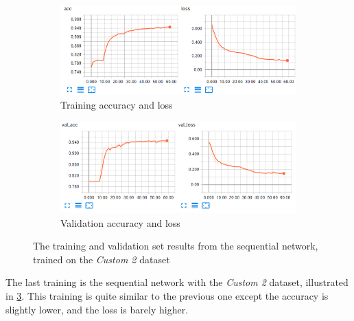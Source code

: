\documentclass[USenglish]{ifimaster}  %
\begin{document}
\begin{figure}[ht]
\centering
\begin{subfigure}[b]{\textwidth}
\centering
\includegraphics[width=1\textwidth]{bilder/custom_2_training/Custom_2_sequential_training_acc_results.png}
\caption{Training accuracy and loss}
\label{fig:custom_2_sequential_acc_result}
\end{subfigure}
\hfill
\begin{subfigure}[b]{\textwidth}
\centering
\includegraphics[width=1\textwidth]{bilder/custom_2_training/Custom_2_sequential_training_val_acc_results.png}
\caption{Validation accuracy and loss}
\label{fig:custom_2_sequential_val_acc_result}
\end{subfigure}
\caption{The training and validation set results from the sequential network, trained on the \textit{Custom 2} dataset}
\label{fig:custom_2_sequential_result}
\end{figure}

The last training is the sequential network with the \textit{Custom 2} dataset, illustrated in \cref{fig:custom_2_sequential_result}. This training is quite similar to the previous one except the accuracy is slightly lower, and the loss is barely higher.
\end{document}
